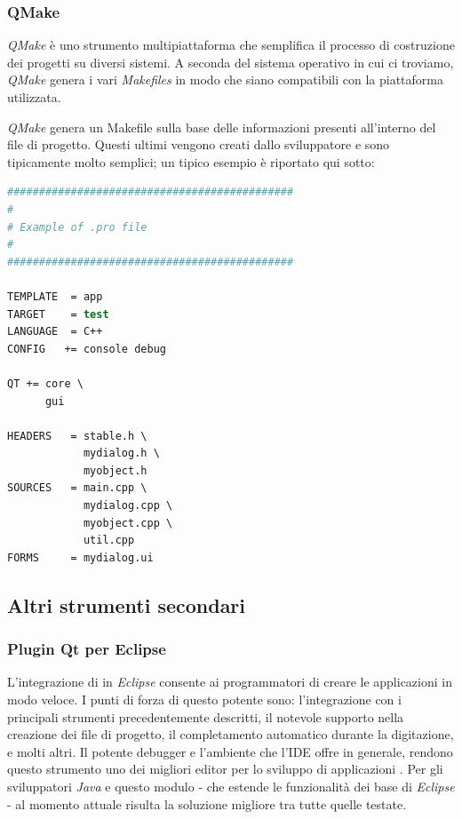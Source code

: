 \subsubsection{QMake}
\emph{QMake} è uno strumento multipiattaforma che semplifica il processo di costruzione dei progetti \qt{} su diversi sistemi. A seconda del sistema operativo in cui ci troviamo, \emph{QMake} genera i vari  \emph{Makefiles} in modo che siano compatibili con la piattaforma utilizzata.

\emph{QMake} genera un Makefile sulla base delle informazioni presenti all'interno del file di progetto. Questi ultimi vengono creati dallo sviluppatore e sono tipicamente molto semplici; un tipico esempio è riportato qui sotto:

\begin{lstlisting}[language=csh]
#############################################
#
# Example of .pro file
#
#############################################

TEMPLATE  = app
TARGET    = test
LANGUAGE  = C++
CONFIG   += console debug

QT += core \
      gui

HEADERS   = stable.h \
            mydialog.h \
            myobject.h
SOURCES   = main.cpp \
            mydialog.cpp \
            myobject.cpp \
            util.cpp
FORMS     = mydialog.ui
\end{lstlisting}

\subsection{Altri strumenti secondari}

\subsubsection{Plugin Qt per Eclipse}
L'integrazione di \qt{} in \emph{Eclipse} consente ai programmatori di creare le applicazioni in modo veloce. I punti di forza di questo potente \plugin{} sono: l'integrazione con i principali strumenti \qt{} precedentemente descritti, il notevole supporto nella creazione dei file di progetto, il completamento automatico durante la digitazione, e molti altri. Il potente debugger e l'ambiente che l'IDE offre in generale, rendono questo strumento uno dei migliori editor per lo sviluppo di applicazioni \qt{}.
Per gli sviluppatori \emph{Java} e \cpp{} questo modulo - che estende le funzionalità dei \plugin{} base di \emph{Eclipse} - al momento attuale risulta la soluzione migliore tra tutte quelle testate.

